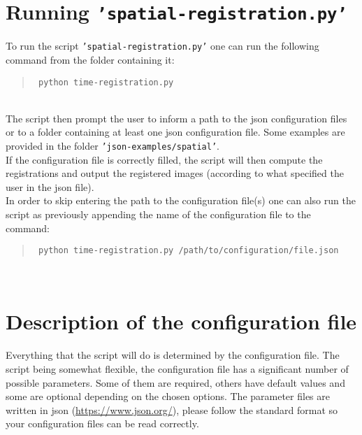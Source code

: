 \documentclass[10pt,a4paper]{book}
\newcommand{\option}[1]{{\texttt{'#1'}}}
\newenvironment{code}[1]{\mbox{}\\[1ex]\hspace*{-#1cm}\begin{minipage}{150mm}\begin{quote}\tt}{\end{quote}\end{minipage}\mbox{}\\[1ex]}
\begin{document}
\section{Running \option{spatial-registration.py}}
To run the script \option{spatial-registration.py} one can run the following command from the folder containing it:
\begin{code}{0.8}
\$ python time-registration.py
\end{code}
The script then prompt the user to inform a path to the json configuration files or to a folder containing at least one json configuration file. Some examples are provided in the folder \option{json-examples/spatial}.\\
If the configuration file is correctly filled, the script will then compute the registrations and output the registered images (according to what specified the user in the json file).\\
In order to skip entering the path to the configuration file(s) one can also run the script as previously appending the name of the configuration file to the command:
\begin{code}{0.8}
\$ python time-registration.py /path/to/configuration/file.json
\end{code}
\section{Description of the configuration file}
\paragraph{}Everything that the script will do is determined by the configuration file. The script being somewhat flexible, the configuration file has a significant number of possible parameters. Some of them are required, others have default values and some are optional depending on the chosen options. The parameter files are written in json (\url{https://www.json.org/}), please follow the standard format so your configuration files can be read correctly.
\end{document}
